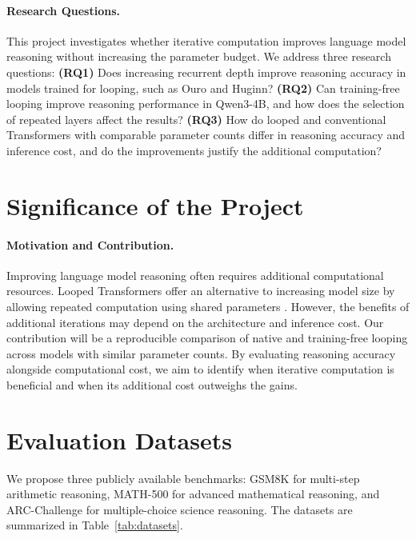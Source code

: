 \documentclass[11pt]{article}
\begin{document}
\paragraph{Research Questions.}
This project investigates whether iterative computation
improves language model reasoning without increasing
the parameter budget. We address three research questions:
\textbf{(RQ1)} Does increasing recurrent depth improve
reasoning accuracy in models trained for looping,
such as Ouro and Huginn?
\textbf{(RQ2)} Can training-free looping improve reasoning
performance in Qwen3-4B, and how does the selection
of repeated layers affect the results?
\textbf{(RQ3)} How do looped and conventional Transformers
with comparable parameter counts differ in reasoning
accuracy and inference cost, and do the improvements
justify the additional computation?

\section{Significance of the Project}
\label{sec:significance_sota}

\paragraph{Motivation and Contribution.}
Improving language model reasoning often requires
additional computational resources. Looped Transformers
offer an alternative to increasing model size by
allowing repeated computation using shared parameters
\cite{geiping2025scaling,zhu2026scaling}.
However, the benefits of additional iterations may
depend on the architecture and inference cost.
Our contribution will be a reproducible comparison
of native and training-free looping across models
with similar parameter counts. By evaluating reasoning
accuracy alongside computational cost, we aim to
identify when iterative computation is beneficial
and when its additional cost outweighs the gains.

\section{Evaluation Datasets}
\label{sec:datasets}

We propose three publicly available benchmarks:
GSM8K \cite{cobbe2021training} for multi-step
arithmetic reasoning, MATH-500
\cite{hendrycks2021math,lightman2024verify}
for advanced mathematical reasoning, and
ARC-Challenge \cite{clark2018arc} for
multiple-choice science reasoning. The datasets are summarized in Table~\ref{tab:datasets}.
\end{document}
